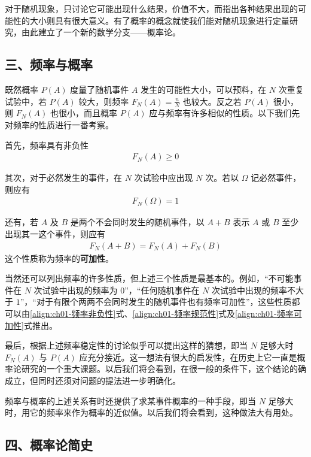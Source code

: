 \documentclass[../../main.tex]{subfiles}
\begin{document}
对于随机现象，只讨论它可能出现什么结果，价值不大，而指出各种结果出现的可能性的大小则具有很大意义。有了概率的概念就使我们能对随机现象进行定量研究，由此建立了一个新的数学分支——概率论。

\subsection*{三、频率与概率}

既然概率 $P(A)$ 度量了随机事件 $A$ 发生的可能性大小，可以预料，在 $N$ 次重复试验中，若 $P(A)$ 较大，则频率 $F_N(A)=\frac{n}{N}$ 也较大。反之若 $P(A)$ 很小，则 $F_N(A)$ 也很小，而且概率 $P(A)$ 应与频率有许多相似的性质。以下我们先对频率的性质进行一番考察。

首先，频率具有非负性
\begin{align}
F_N(A)\geqslant 0\label{align:ch01-频率非负性}
\end{align}

其次，对于必然发生的事件，在 $N$ 次试验中应出现 $N$ 次。若以 $\Omega$ 记必然事件，则应有
\begin{align}
F_N(\Omega)=1\label{align:ch01-频率规范性}
\end{align}

还有，若 $A$ 及 $B$ 是两个不会同时发生的随机事件，以 $A+B$ 表示 $A$ 或 $B$ 至少出现其一这个事件，则应有
\begin{align}
F_N(A+B)=F_N(A)+F_N(B)\label{align:ch01-频率可加性}
\end{align}
这个性质称为频率的\textbf{可加性}。

当然还可以列出频率的许多性质，但上述三个性质是最基本的。例如，“不可能事件在 $N$ 次试验中出现的频率为 $0$”，“任何随机事件在 $N$ 次试验中出现的频率不大于 $1$”，“对于有限个两两不会同时发生的随机事件也有频率可加性”，这些性质都可以由\eqref{align:ch01-频率非负性}式、\eqref{align:ch01-频率规范性}式及\eqref{align:ch01-频率可加性}式推出。

最后，根据上述频率稳定性的讨论似乎可以提出这样的猜想，即当 $N$ 足够大时 $F_N(A)$ 与 $P(A)$ 应充分接近。这一想法有很大的启发性，在历史上它一直是概率论研究的一个重大课题。以后我们将会看到，在很一般的条件下，这个结论的确成立，但同时还须对问题的提法进一步明确化。

频率与概率的上述关系有时还提供了求某事件概率的一种手段，即当 $N$ 足够大时，用它的频率来作为概率的近似值。以后我们将会看到，这种做法大有用处。

\subsection*{四、概率论简史}
\end{document}
